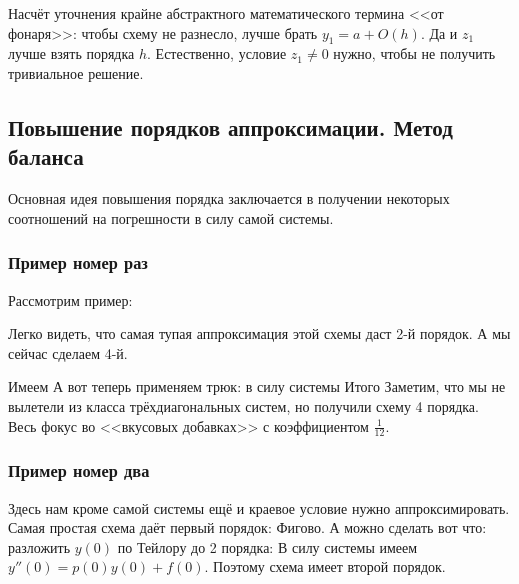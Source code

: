 \documentclass[a4paper]{article}
\begin{document}
\begin{note}
Насчёт уточнения крайне абстрактного математического термина <<от
фонаря>>: чтобы схему не разнесло, лучше брать $y_1 = a + O(h)$.  Да и
$z_1$ лучше взять порядка $h$. Естественно, условие $z_1\neq 0$ нужно,
чтобы не получить тривиальное решение.
\end{note}

\subsection{Повышение порядков аппроксимации. Метод баланса}

Основная идея повышения порядка заключается в получении некоторых
соотношений на погрешности в силу самой системы.

\subsubsection{Пример номер раз}

Рассмотрим пример: 

Легко видеть, что самая тупая аппроксимация этой схемы даст 2-й
порядок. А мы сейчас сделаем 4-й.

Имеем   А вот теперь применяем трюк: в силу системы   Итого     Заметим, что мы не вылетели из класса
трёхдиагональных систем, но получили схему 4 порядка.  Весь фокус во
<<вкусовых добавках>> с коэффициентом $\frac{1}{12}$.

\subsubsection{Пример номер два}


Здесь нам кроме самой системы ещё и краевое условие нужно
аппроксимировать.  Самая простая схема даёт первый порядок:
  Фигово. А можно сделать вот
что: разложить $y(0)$ по Тейлору до 2 порядка:   В силу системы имеем $y''(0) = p(0) y(0)
+ f(0)$.  Поэтому схема   имеет второй порядок.
\end{document}
